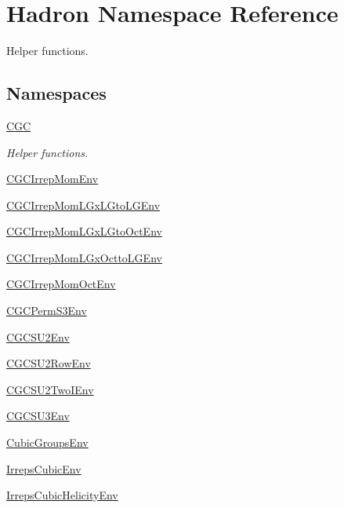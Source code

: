 \hypertarget{namespaceHadron}{}\section{Hadron Namespace Reference}
\label{namespaceHadron}


Helper functions.  


\subsection*{Namespaces}
\begin{DoxyCompactItemize}
\item 
 \mbox{\hyperlink{namespaceHadron_1_1CGC}{C\+GC}}
\begin{DoxyCompactList}\small\item\em Helper functions. \end{DoxyCompactList}\item 
 \mbox{\hyperlink{namespaceHadron_1_1CGCIrrepMomEnv}{C\+G\+C\+Irrep\+Mom\+Env}}
\item 
 \mbox{\hyperlink{namespaceHadron_1_1CGCIrrepMomLGxLGtoLGEnv}{C\+G\+C\+Irrep\+Mom\+L\+Gx\+L\+Gto\+L\+G\+Env}}
\item 
 \mbox{\hyperlink{namespaceHadron_1_1CGCIrrepMomLGxLGtoOctEnv}{C\+G\+C\+Irrep\+Mom\+L\+Gx\+L\+Gto\+Oct\+Env}}
\item 
 \mbox{\hyperlink{namespaceHadron_1_1CGCIrrepMomLGxOcttoLGEnv}{C\+G\+C\+Irrep\+Mom\+L\+Gx\+Octto\+L\+G\+Env}}
\item 
 \mbox{\hyperlink{namespaceHadron_1_1CGCIrrepMomOctEnv}{C\+G\+C\+Irrep\+Mom\+Oct\+Env}}
\item 
 \mbox{\hyperlink{namespaceHadron_1_1CGCPermS3Env}{C\+G\+C\+Perm\+S3\+Env}}
\item 
 \mbox{\hyperlink{namespaceHadron_1_1CGCSU2Env}{C\+G\+C\+S\+U2\+Env}}
\item 
 \mbox{\hyperlink{namespaceHadron_1_1CGCSU2RowEnv}{C\+G\+C\+S\+U2\+Row\+Env}}
\item 
 \mbox{\hyperlink{namespaceHadron_1_1CGCSU2TwoIEnv}{C\+G\+C\+S\+U2\+Two\+I\+Env}}
\item 
 \mbox{\hyperlink{namespaceHadron_1_1CGCSU3Env}{C\+G\+C\+S\+U3\+Env}}
\item 
 \mbox{\hyperlink{namespaceHadron_1_1CubicGroupsEnv}{Cubic\+Groups\+Env}}
\item 
 \mbox{\hyperlink{namespaceHadron_1_1IrrepsCubicEnv}{Irreps\+Cubic\+Env}}
\item 
 \mbox{\hyperlink{namespaceHadron_1_1IrrepsCubicHelicityEnv}{Irreps\+Cubic\+Helicity\+Env}}

\end{DoxyCompactItemize}
